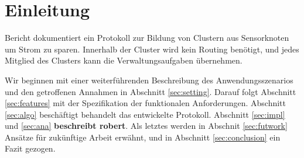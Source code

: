 \section{Einleitung} \label{sec:intro}
 Bericht dokumentiert ein Protokoll zur Bildung von Clustern aus Sensorknoten um Strom zu sparen. Innerhalb der Cluster wird kein Routing ben\"otigt, und jedes Mitglied des Clusters kann die Verwaltungsaufgaben \"ubernehmen.

Wir beginnen mit einer weiterf\"uhrenden Beschreibung des Anwendungsszenarios und den getroffenen Annahmen in Abschnitt \ref{sec:setting}.
Darauf folgt Abschnitt \ref{sec:features} mit der Spezifikation der funktionalen Anforderungen.
Abschnitt \ref{sec:algo} besch\"aftigt behandelt das entwickelte Protokoll.
Abschnitt \ref{sec:impl} und \ref{sec:ana} \textbf{beschreibt robert}.
Als letztes werden in Abschnit \ref{sec:futwork} Ans\"atze f\"ur zuk\"unftige Arbeit erw\"ahnt, und in Abschnitt \ref{sec:conclusion} ein Fazit gezogen.
